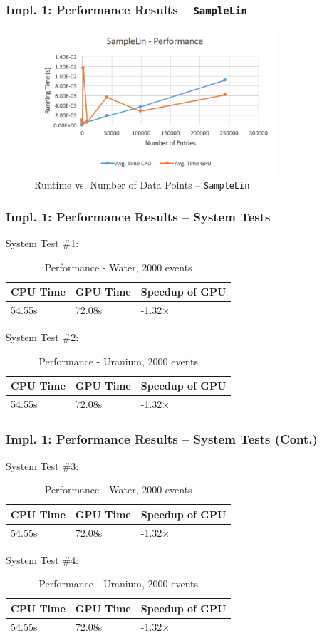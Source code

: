 \documentclass{beamer}
\begin{document}
\begin{frame}
\frametitle{Impl. 1: Performance Results -- \texttt{SampleLin}}
\begin{figure}
\centering
\includegraphics[width=0.8\textwidth]{images/samplelin_line.png}
\caption{Runtime vs. Number of Data Points -- \texttt{SampleLin}}
\end{figure}
\end{frame}

\begin{frame}
\frametitle{Impl. 1: Performance Results -- System Tests}
System Test \#1:
\begin{table}
	\begin{tabular}{lll}
	\toprule
	\bf CPU Time&\bf  GPU Time&\bf Speedup of GPU\\\midrule
	54.55s&72.08s&-1.32$\times$\\\bottomrule
	\end{tabular}
	\caption{Performance - Water, 2000 events}
\end{table}
System Test \#2:
\begin{table}
	\begin{tabular}{lll}
	\toprule
	\bf CPU Time&\bf  GPU Time&\bf Speedup of GPU\\\midrule
	54.55s&72.08s&-1.32$\times$\\\bottomrule
	\end{tabular}
	\caption{Performance - Uranium, 2000 events}
\end{table}
\end{frame}

\begin{frame}
\frametitle{Impl. 1: Performance Results -- System Tests (Cont.)}
System Test \#3:
\begin{table}
	\begin{tabular}{lll}
	\toprule
	\bf CPU Time&\bf  GPU Time&\bf Speedup of GPU\\\midrule
	54.55s&72.08s&-1.32$\times$\\\bottomrule
	\end{tabular}
	\caption{Performance - Water, 2000 events}
\end{table}
System Test \#4:
\begin{table}
	\begin{tabular}{lll}
	\toprule
	\bf CPU Time&\bf  GPU Time&\bf Speedup of GPU\\\midrule
	54.55s&72.08s&-1.32$\times$\\\bottomrule
	\end{tabular}
	\caption{Performance - Uranium, 2000 events}
\end{table}\end{frame}
\end{document}
